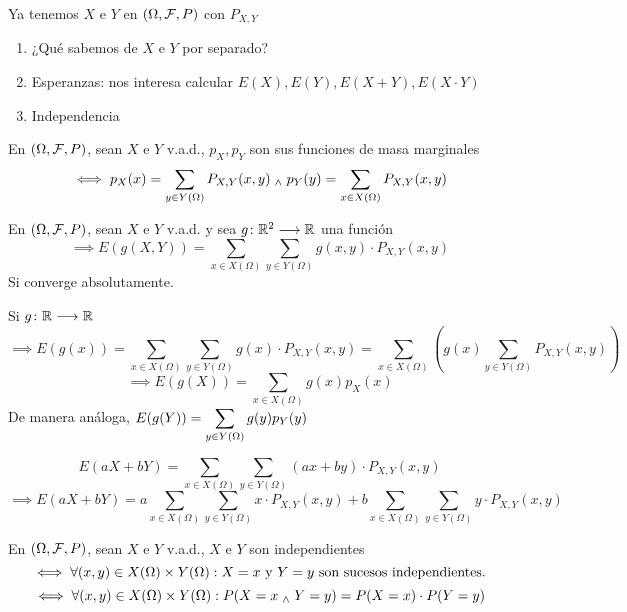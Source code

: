 Ya tenemos $X$ e $Y$ en $(\Omega, \mathcal{F}, P)$ con $P_{X,Y}$
\begin{enumerate}
	\item ¿Qué sabemos de $X$ e $Y$ por separado?
	\item Esperanzas: nos interesa calcular $E(X), E(Y), E(X+Y), E(X\cdot Y)$
	\item Independencia
\end{enumerate}
\begin{defn}
	En $(\Omega, \mathcal{F}, P)$, sean $X$ e $Y$ v.a.d., $p_{X}, p_{Y}$ son sus funciones de masa marginales
	\[\iff p_X(x)=\sum_{y\in Y(\Omega)} P_{X, Y} (x, y) \; _{\wedge} \; p_Y(y)=\sum_{x\in X(\Omega)} P_{X, Y} (x, y)\]
\end{defn}

\begin{teo}
	En $(\Omega, \mathcal{F}, P)$, sean $X$ e $Y$ v.a.d. y sea $g \colon \mathbb{R}^2 \longrightarrow \mathbb{R}$ una función
	\[\implies E(g(X, Y))=\sum_{x\in X(\Omega)} \sum_{y\in Y(\Omega)} g(x, y) \cdot P_{X,Y}(x,y)\]
	Si converge absolutamente.
	\begin{dem}

	\end{dem}
\end{teo}

\begin{obs}
	Si $g \colon \mathbb{R} \longrightarrow \mathbb{R}$
	\[\implies E(g(x)) = \sum_{x\in X(\Omega)} \sum_{y\in Y(\Omega)} g(x) \cdot P_{X,Y}(x,y) = \sum_{x\in X(\Omega)} \left(g(x)\sum_{y\in Y(\Omega)}P_{X,Y}(x,y)\right)\]
	\[\implies E(g(X))=\sum_{x\in X(\Omega)} g(x) p_X(x)\]
	De manera análoga, $\displaystyle E(g(Y))=\sum_{y\in Y(\Omega)} g(y) p_Y(y)$
\end{obs}

\begin{ejem}[$E(aX+bY)=aE(X)+bE(Y)$]
	\[E(aX+bY)=\sum_{x\in X(\Omega)} \sum_{y\in Y(\Omega)} (ax+by)\cdot P_{X,Y}(x,y)\]
	\[\implies E(aX+bY)=a\sum_{x\in X(\Omega)} \sum_{y\in Y(\Omega)} x\cdot P_{X,Y}(x,y) + b\sum_{x\in X(\Omega)} \sum_{y\in Y(\Omega)} y\cdot P_{X,Y}(x,y)\]
\end{ejem}

\begin{defn}[Independencia de v.a.d.]
	En $(\Omega, \mathcal{F}, P)$, sean $X$ e $Y$ v.a.d., $X$ e $Y$ son independientes
	\[\iff \forall (x,y) \in X(\Omega)\times Y(\Omega) : {X=x} \text{ y } {Y=y} \text{ son sucesos independientes.}\]
	\[\iff \forall (x,y) \in X(\Omega)\times Y(\Omega) : P(X=x\; _{\wedge} \; Y=y)=P(X=x)\cdot P(Y=y)\]
\end{defn}

